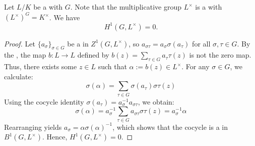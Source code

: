 \begin{theorem} \label{theorem:hilberts_theorem_90_multiplicative_version}
    Let $L/K$ be a   with  $G$. Note that the multiplicative group $L^\times$ is a  with $(L^\times)^G = K^\times$. 
    We have 
    $$H^1(G, L^\times) = 0.$$
\end{theorem}

\begin{proof}
    Let $\{a_\sigma\}_{\sigma \in G}$ be a  in $Z^1(G, L^\times)$, so $a_{\sigma\tau} = a_\sigma \sigma(a_\tau)$ for all $\sigma, \tau \in G$. By the , the map $b: L \to L$ defined by $b(z) = \sum_{\tau \in G} a_\tau \tau(z)$ is not the zero map. Thus, there exists some $z \in L$ such that $\alpha := b(z) \in L^\times$. For any $\sigma \in G$, we calculate:
    $$\sigma(\alpha) = \sum_{\tau \in G} \sigma(a_\tau) \sigma\tau(z)$$
    Using the cocycle identity $\sigma(a_\tau) = a_\sigma^{-1} a_{\sigma\tau}$, we obtain:
    $$\sigma(\alpha) = a_\sigma^{-1} \sum_{\tau \in G} a_{\sigma\tau} \sigma\tau(z) = a_\sigma^{-1} \alpha$$
    Rearranging yields $a_\sigma = \alpha \sigma(\alpha)^{-1}$, which shows that the cocycle is a  in $B^1(G, L^\times)$. Hence, $H^1(G, L^\times) = 0$.
\end{proof}